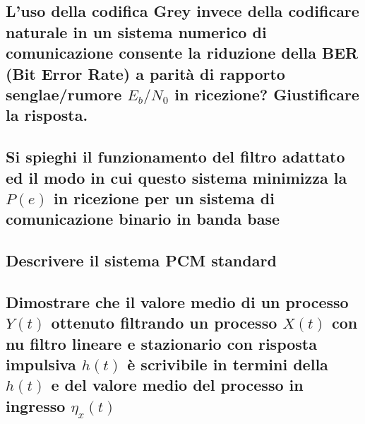 \documentclass[12pt,oneside,openany]{memoir}
\numberwithin{equation}{subsection}
\begin{document}
\newpage
\subsection{L'uso della codifica Grey invece della codificare naturale in un
sistema numerico di comunicazione consente la riduzione della BER (Bit Error
Rate) a parit\`a di rapporto senglae/rumore $E_b/N_0$ in ricezione? Giustificare
la risposta.}


\newpage
\subsection{Si spieghi il funzionamento del filtro adattato ed il modo in cui
questo sistema minimizza la $P(e)$ in ricezione per un sistema di comunicazione
binario in banda base}


\newpage
\subsection{Descrivere il sistema PCM standard}


\newpage
\subsection{Dimostrare che il valore medio di un processo $Y(t)$ ottenuto
filtrando un processo $X(t)$ con nu filtro lineare e stazionario con risposta
impulsiva $h(t)$ \`e scrivibile in termini della $h(t)$ e del valore medio del
processo in ingresso $\eta_x(t)$}
\end{document}
